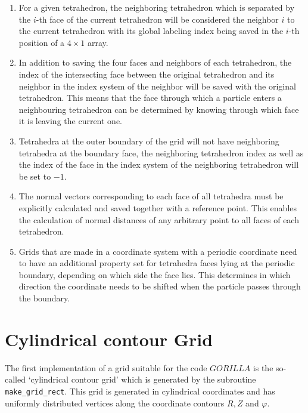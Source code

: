 \documentclass[./main.tex]{subfiles}
\begin{document}
\begin{enumerate}
	\item For a given tetrahedron, the neighboring tetrahedron which is separated by the $i$-th face of the current tetrahedron will be considered the neighbor $i$ to the current tetrahedron with its global labeling index being saved in the $i$-th position of a $4\times1$ array.
	
	\item In addition to saving the four faces and neighbors of each tetrahedron, the index of the intersecting face between the original tetrahedron and its neighbor in the index system of the neighbor will be saved with the original tetrahedron. This means that the face through which a particle enters a neighbouring tetrahedron can be determined by knowing through which face it is leaving the current one.
	
	\item Tetrahedra at the outer boundary of the grid will not have neighboring tetrahedra at the boundary face, the neighboring tetrahedron index as well as the index of the face in the index system of the neighboring tetrahedron will be set to $-1$.
	
	\item The normal vectors corresponding to each face of all tetrahedra must be explicitly calculated and saved together with a reference point. This enables the calculation of normal distances of any arbitrary point to all faces of each tetrahedron.
	
	\item Grids that are made in a coordinate system with a periodic coordinate need to have an additional property set for tetrahedra faces lying at the periodic boundary, depending on which side the face lies. This determines in which direction the coordinate needs to be shifted when the particle passes through the boundary. 
\end{enumerate}

\section{Cylindrical contour Grid}
The first implementation of a grid suitable for the code $GORILLA$ is the so-called \enquote*{cylindrical contour grid} which is generated by the subroutine \texttt{make\_grid\_rect}. This grid is generated in cylindrical coordinates and has uniformly distributed vertices along the coordinate contours $R, Z$ and $\varphi$. 
\end{document}
